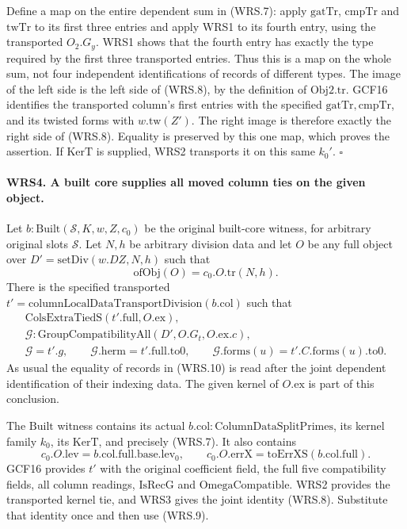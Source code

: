 Define a map on the entire dependent sum in (WRS.7): apply
\(\mathrm{gatTr}\), \(\mathrm{cmpTr}\) and
\(\mathrm{twTr}\) to its first three entries and apply WRS1 to
its fourth entry, using the transported \(O_2.G_y\).  WRS1 shows
that the fourth entry has exactly the type required by the first
three transported entries.  Thus this is a map on the whole sum,
not four independent identifications of records of different types.
The image of the left side is the left side of (WRS.8), by the
definition of \(\mathrm{Obj2.tr}\).  GCF16 identifies the
transported column's first entries with the specified
\(\mathrm{gatTr},\mathrm{cmpTr}\), and its twisted forms with
\(w.\mathrm{tw}(Z')\).  The right image is therefore exactly the
right side of (WRS.8).  Equality is preserved by this one map,
which proves the assertion.  If \(\mathrm{KerT}\) is supplied,
WRS2 transports it on this same \(k_0'\).
\hfill\(\square\)

\paragraph{WRS4. A built core supplies all moved column ties on the given object.}
\label{claim:WRS4}
Let \(b:\mathrm{Built}(\mathcal S,K,w,Z,c_0)\) be the original
built-core witness, for arbitrary original slots \(\mathcal S\).
Let \(N,h\) be arbitrary division data and let \(O\) be any full
object over \(D'=\mathrm{setDiv}(w.DZ,N,h)\) such that
\[
             \mathrm{ofObj}(O)=c_0.O.\mathrm{tr}(N,h).
 \tag{WRS.9}
\]
There is the specified transported
\(t'=\mathrm{columnLocalDataTransportDivision}(b.\mathrm{col})\)
such that
\[
 \begin{gathered}
 \mathrm{ColsExtraTiedS}(t'.\mathrm{full},O.\mathrm{ex}),\\
 \mathcal G:\mathrm{GroupCompatibilityAll}
             (D',O.G_t,O.\mathrm{ex}.c),\\
 \mathcal G=t'.g,\qquad
 \mathcal G.\mathrm{herm}=t'.\mathrm{full}.\mathrm{to0},\qquad
 \mathcal G.\mathrm{forms}(u)=t'.C.\mathrm{forms}(u).\mathrm{to0}.
 \end{gathered}                                                   \tag{WRS.10}
\]
As usual the equality of records in (WRS.10) is read after the
joint dependent identification of their indexing data.  The given
kernel of \(O.\mathrm{ex}\) is part of this conclusion.

The \(\mathrm{Built}\) witness contains its actual
\(b.\mathrm{col}:\mathrm{ColumnDataSplitPrimes}\), its kernel
family \(k_0\), its \(\mathrm{KerT}\), and precisely (WRS.7).
It also contains
\[
 c_0.O.\mathrm{lev}=b.\mathrm{col.full.base.lev}_0,
 \qquad c_0.O.\mathrm{errX}=\mathrm{toErrXS}(b.\mathrm{col.full}).
 \tag{WRS.11}
\]
GCF16 provides \(t'\) with the original coefficient field, the
full five compatibility fields, all column readings, \(\mathrm{IsRecG}\)
and \(\mathrm{OmegaCompatible}\).  WRS2 provides the transported
kernel tie, and WRS3 gives the joint identity (WRS.8).
Substitute that identity once and then use (WRS.9).

